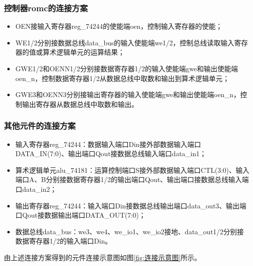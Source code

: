 \documentclass[a4paper]{ctexart}
\begin{document}
\begin{spacing}{1.3}
	\subsubsection{控制器romc的连接方案}\label{控制器romc的连接方案}
	\begin{itemize}
		\item OEN接输入寄存器reg\_74244的使能端oen，控制输入寄存器的使能；
		\item WE1/2分别接数据总线data\_bus的输入使能端we1/2，控制总线读取输入寄存器的值或算术逻辑单元的运算结果；
		\item GWE1/2和OENN1/2分别接数据寄存器1/2的输入使能端gwe和输出使能端oen\_n，控制数据寄存器1/2从数据总线中取数和输出到算术逻辑单元；
		\item GWE3和OENN3分别接输出寄存器的输入使能端gwe和输出使能端oen\_n，控制输出寄存器从数据总线中取数和输出。
	\end{itemize}

	\subsubsection{其他元件的连接方案}
	\begin{itemize}
		\item 输入寄存器reg\_74244：数据输入端口Din接外部数据输入端口DATA\_IN(7:0)、输出端口Qout接数据总线输入端口data\_in1；
		\item 算术逻辑单元alu\_74181：运算控制端口S接外部数据输入端口CTL(3:0)、输入端口A、B分别接数据寄存器1/2的输出端口Qout、输出端口接数据总线输入端口data\_in2；
		\item 输出寄存器reg\_74244：输入端口Din接数据总线输出端口data\_out3、输出端口Qout接数据输出端口DATA\_OUT(7:0)；
		\item 数据总线data\_bus：we3、we4、we\_io1、we\_io2接地、data\_out1/2分别接数据寄存器1/2的输入端口Din。
	\end{itemize}

	由上述连接方案得到的元件连接示意图如图\ref{fig:连接示意图}所示。


\end{spacing}
\end{document}
